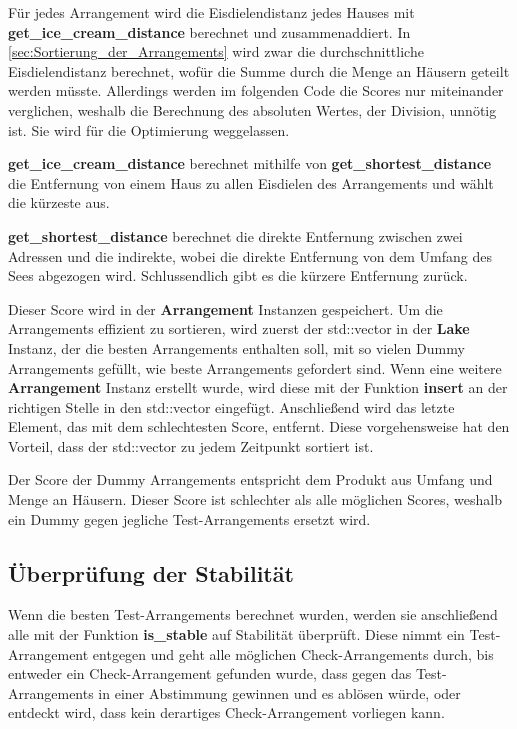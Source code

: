 \documentclass[a4paper,10pt,ngerman,captions=figureheading]{scrartcl}
\begin{document}
Für jedes Arrangement wird die Eisdielendistanz jedes Hauses mit \textbf{get\_ice\_cream\_distance} berechnet und zusammenaddiert.
In \autoref{sec:Sortierung_der_Arrangements} wird zwar die durchschnittliche Eisdielendistanz berechnet, wofür die Summe durch die Menge an Häusern geteilt werden müsste.
Allerdings werden im folgenden Code die Scores nur miteinander verglichen, weshalb die Berechnung des absoluten Wertes, der Division, unnötig ist.
Sie wird für die Optimierung weggelassen.

\medskip
\begin{addmargin}[3em]{4em}
    \textbf{get\_ice\_cream\_distance} berechnet mithilfe von \textbf{get\_shortest\_distance} die Entfernung von einem Haus zu allen Eisdielen des Arrangements und wählt die kürzeste aus.
\end{addmargin}

\medskip
\begin{addmargin}[3em]{4em}
    \textbf{get\_shortest\_distance} berechnet die direkte Entfernung zwischen zwei Adressen und die indirekte, wobei die direkte Entfernung von dem Umfang des Sees abgezogen wird.
    Schlussendlich gibt es die kürzere Entfernung zurück.
\end{addmargin}

\medskip
Dieser Score wird in der \textbf{Arrangement} Instanzen gespeichert.
Um die Arrangements effizient zu sortieren, wird zuerst der std::vector in der \textbf{Lake} Instanz, der die besten Arrangements enthalten soll, mit so vielen Dummy Arrangements gefüllt, wie beste Arrangements gefordert sind.
Wenn eine weitere \textbf{Arrangement} Instanz erstellt wurde, wird diese mit der Funktion \textbf{insert} an der richtigen Stelle in den std::vector eingefügt.
Anschließend wird das letzte Element, das mit dem schlechtesten Score, entfernt.
Diese vorgehensweise hat den Vorteil, dass der std::vector zu jedem Zeitpunkt sortiert ist.

Der Score der Dummy Arrangements entspricht dem Produkt aus Umfang und Menge an Häusern.
Dieser Score ist schlechter als alle möglichen Scores, weshalb ein Dummy gegen jegliche Test-Arrangements ersetzt wird.

\subsection{Überprüfung der Stabilität}
\label{sec:Überprüfung_der_Stabilität}
Wenn die besten Test-Arrangements berechnet wurden, werden sie anschließend alle mit der Funktion \textbf{is\_stable} auf Stabilität überprüft.
Diese nimmt ein Test-Arrangement entgegen und geht alle möglichen Check-Arrangements durch, bis entweder ein Check-Arrangement gefunden wurde, dass gegen das Test-Arrangements in einer Abstimmung gewinnen und es ablösen würde, oder entdeckt wird, dass kein derartiges Check-Arrangement vorliegen kann.
\end{document}

